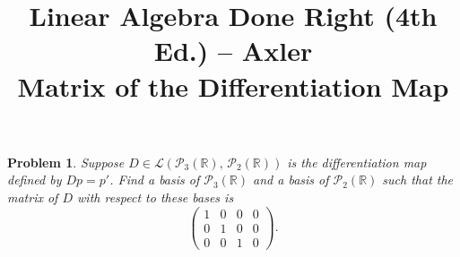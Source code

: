 \documentclass[12pt]{article}
\title{Linear Algebra Done Right (4th Ed.) -- Axler\\[0.5em]
       \large Matrix of the Differentiation Map}
\author{}
\date{}
\newtheorem*{problem}{Problem}
\begin{document}
\maketitle
 
\begin{problem}
Suppose $D \in \mathcal{L}(\mathcal{P}_3(\mathbb{R}),\, \mathcal{P}_2(\mathbb{R}))$ is the
differentiation map defined by $Dp = p'$. Find a basis of $\mathcal{P}_3(\mathbb{R})$ and a
basis of $\mathcal{P}_2(\mathbb{R})$ such that the matrix of $D$ with respect to these bases
is
\[
  \begin{pmatrix}
    1 & 0 & 0 & 0 \\
    0 & 1 & 0 & 0 \\
    0 & 0 & 1 & 0
  \end{pmatrix}.
\]
\end{problem}
 
\end{document}
